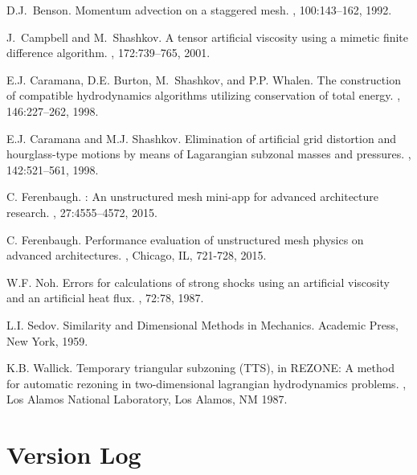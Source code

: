 \documentclass[11pt,letterpaper]{article}
\begin{document}
\begin{thebibliography}{9}


D.J.~Benson.
\newblock Momentum advection on a staggered mesh.
, 100:143--162, 1992.

J.~Campbell and M.~Shashkov.
\newblock A tensor artificial viscosity using a mimetic finite difference
  algorithm.
, 172:739--765, 2001.

E.J. Caramana, D.E. Burton, M.~Shashkov, and P.P. Whalen.
\newblock The construction of compatible hydrodynamics algorithms utilizing
  conservation of total energy.
, 146:227--262, 1998.

E.J. Caramana and M.J. Shashkov.
\newblock Elimination of artificial grid distortion and hourglass-type motions
  by means of {L}agarangian subzonal masses and pressures.
, 142:521--561, 1998.

C. Ferenbaugh.
: An unstructured mesh mini-app for advanced
  architecture research.
, 27:4555--4572, 2015.

C. Ferenbaugh.  
\newblock Performance evaluation of unstructured mesh physics on
  advanced architectures.
, Chicago, IL, 721-728, 2015.

W.F. Noh.
\newblock Errors for calculations of strong shocks using an artificial viscosity and an artificial heat flux.
, 72:78, 1987.

L.I. Sedov.
\newblock Similarity and Dimensional Methods in Mechanics.
\newblock Academic Press, New York, 1959.

K.B. Wallick.
\newblock Temporary triangular subzoning ({TTS}), in {REZONE}: A method for
  automatic rezoning in two-dimensional lagrangian hydrodynamics problems.
, Los Alamos National Laboratory, Los
  Alamos, NM 1987.

\end{thebibliography}


\appendix
\section{Version Log}
\end{document}
